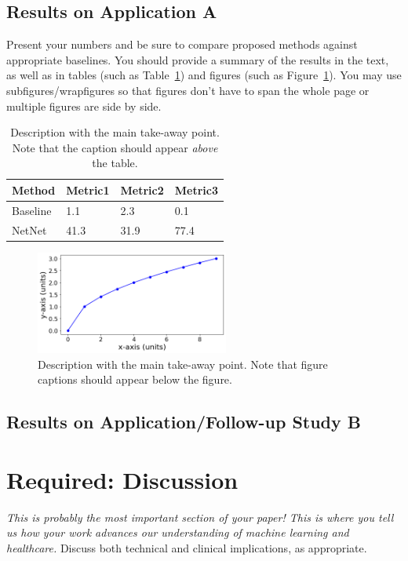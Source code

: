 \documentclass[pmlr]{jmlr}%
\begin{document}
\subsection{Results on Application A} 

Present your numbers and be sure to compare proposed methods against appropriate baselines. 
You should provide a summary of
the results in the text, 
as well as in tables (such as
Table~\ref{tab:example}) and figures (such as
Figure~\ref{fig:example}).  
You may use subfigures/wrapfigures 
so that figures don't have to span the whole page or multiple figures are side by side.

\begin{table}[t]
  \centering 
  \caption{Description with the main take-away point. Note that the caption should appear \emph{above} the table.}
  \begin{tabular}{llll}
  \toprule
    \textbf{Method} & \textbf{Metric1} & \textbf{Metric2} & \textbf{Metric3} \\
    \midrule
    Baseline & 1.1 & 2.3 & 0.1 \\ 
    NetNet & 41.3 & 31.9 & 77.4 \\ 
    \bottomrule
  \end{tabular}
  \label{tab:example} 
\end{table}

\begin{figure}[t]
  \centering 
  \includegraphics[width=2.5in]{plot.png} 
  \caption{Description with the main take-away point. Note that figure captions should appear below the figure.}
  \label{fig:example} 
\end{figure} 

\subsection{Results on Application/Follow-up Study B} 

\section{Required: Discussion} 

\emph{This is probably the most important section of your paper!  This
  is where you tell us how your work advances our understanding of
  machine learning and healthcare.}  Discuss both technical and
clinical implications, as appropriate.
\end{document}
